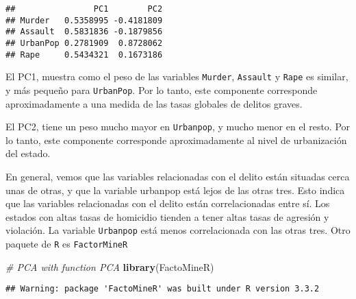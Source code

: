 \documentclass[]{article}
\newenvironment{Shaded}{\begin{snugshade}}{\end{snugshade}}
\newcommand{\KeywordTok}[1]{\textcolor[rgb]{0.13,0.29,0.53}{\textbf{{#1}}}}
\newcommand{\DataTypeTok}[1]{\textcolor[rgb]{0.13,0.29,0.53}{{#1}}}
\newcommand{\DecValTok}[1]{\textcolor[rgb]{0.00,0.00,0.81}{{#1}}}
\newcommand{\StringTok}[1]{\textcolor[rgb]{0.31,0.60,0.02}{{#1}}}
\newcommand{\CommentTok}[1]{\textcolor[rgb]{0.56,0.35,0.01}{\textit{{#1}}}}
\newcommand{\OtherTok}[1]{\textcolor[rgb]{0.56,0.35,0.01}{{#1}}}
\newcommand{\NormalTok}[1]{{#1}}
\numberwithin{equation}{section}
\begin{document}
\begin{Shaded}
\end{Shaded}

\begin{verbatim}
##                PC1        PC2
## Murder   0.5358995 -0.4181809
## Assault  0.5831836 -0.1879856
## UrbanPop 0.2781909  0.8728062
## Rape     0.5434321  0.1673186
\end{verbatim}

El PC1, muestra como el peso de las variables \texttt{Murder},
\texttt{Assault} y \texttt{Rape} es similar, y más pequeño para
\texttt{UrbanPop}. Por lo tanto, este componente corresponde
aproximadamente a una medida de las tasas globales de delitos graves.

El PC2, tiene un peso mucho mayor en \texttt{Urbanpop}, y mucho menor en
el resto. Por lo tanto, este componente corresponde aproximadamente al
nivel de urbanización del estado.

En general, vemos que las variables relacionadas con el delito están
situadas cerca unas de otras, y que la variable urbanpop está lejos de
las otras tres. Esto indica que las variables relacionadas con el delito
están correlacionadas entre sí. Los estados con altas tasas de homicidio
tienden a tener altas tasas de agresión y violación. La variable
\texttt{Urbanpop} está menos correlacionada con las otras tres. Otro
paquete de \texttt{R} es \texttt{FactorMineR}

\begin{Shaded}
\begin{Highlighting}[]
\CommentTok{# PCA with function PCA}
\KeywordTok{library}\NormalTok{(FactoMineR)}
\end{Highlighting}
\end{Shaded}

\begin{verbatim}
## Warning: package 'FactoMineR' was built under R version 3.3.2
\end{verbatim}

\begin{Shaded}
\end{Shaded}
\end{document}
